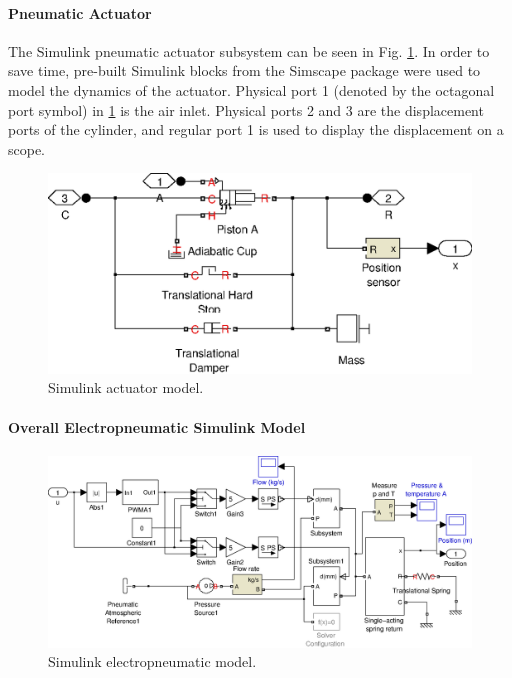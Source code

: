 \paragraph{Pneumatic Actuator}

The Simulink pneumatic actuator subsystem can be seen in Fig. \ref{fig:pneumatics_actuator}. In order to save time, pre-built Simulink blocks from the Simscape package were used to model the dynamics of the actuator. Physical port 1 (denoted by the octagonal port symbol) in \ref{fig:pneumatics_actuator} is the air inlet. Physical ports 2 and 3 are the displacement ports of the cylinder, and regular port 1 is used to display the displacement on a scope.

\begin{figure}[h]
\centering
\includegraphics[scale=1]{implementation/figures/pneumatic_modelling3}
\caption{Simulink actuator model.}
\label{fig:pneumatics_actuator}
\end{figure}

\paragraph{Overall Electropneumatic Simulink Model}

\begin{figure}[h]
\centering
\includegraphics[scale=0.65]{implementation/figures/pneumatic_modelling4}
\caption{Simulink electropneumatic model.}
\label{fig:pneumatics_model}
\end{figure}

